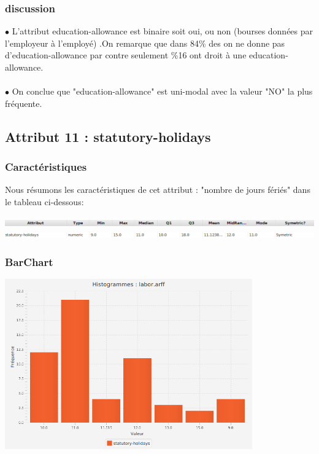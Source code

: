 \documentclass[12pt,a4paper,oneside]{book}
\begin{document}
 \subsubsection{discussion}
$\bullet$ L'attribut education-allowance est binaire soit oui, ou non (bourses données par l'employeur à l'employé) .On remarque que dans 84\%  des on ne donne pas d'education-allowance  par contre  seulement \%16  ont droit à une education-allowance.\\
\textbf{ }\\
$\bullet$ On conclue que "education-allowance" est uni-modal avec la valeur "NO" la plus fréquente.
 
 
\newpage

\subsection{Attribut 11 : statutory-holidays}
\subsubsection{Caractéristiques}
Nous résumons les caractéristiques de cet attribut : "nombre de jours fériés" dans le tableau ci-dessous:
\begin{center}
	\includegraphics[width=1\textwidth]{screens/att.png}\\ \includegraphics[width=1\textwidth]{screens/att-11.png}%
	\label{labelname}%
\end{center}

\subsubsection{BarChart}
\begin{center}
	\includegraphics[width=0.8\textwidth]{screens/barchart/statutory-holidays-barchart.png}%
	\label{labelname}%
\end{center}
\end{document}
